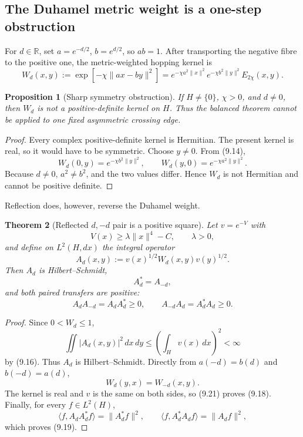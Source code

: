 \documentclass[11pt]{article}
\newtheorem{theorem}{Theorem}[section]
\newtheorem{proposition}[theorem]{Proposition}
\theoremstyle{remark}
\begin{document}
\subsection{The Duhamel metric weight is a one-step obstruction}

For \(d\in\mathbb R\), set \(a=e^{-d/2}\), \(b=e^{d/2}\), so \(ab=1\).
After transporting the negative fibre to the positive one, the
metric-weighted hopping kernel is
\[
 W_d(x,y)
 :=\exp\!\left[-\chi\|ax-by\|^2\right]
 =e^{-\chi a^2\|x\|^2}e^{-\chi b^2\|y\|^2}E_{2\chi}(x,y).
                                                               \tag{9.14}
\]

\begin{proposition}[Sharp symmetry obstruction]
\label{prop:v19v6-asymmetry}
If \(H\neq\{0\}\), \(\chi>0\), and \(d\neq0\), then \(W_d\) is not a
positive-definite kernel on \(H\).  Thus the balanced theorem cannot be
applied to one fixed asymmetric crossing edge.
\end{proposition}

\begin{proof}
Every complex positive-definite kernel is Hermitian.  The present kernel is
real, so it would have to be symmetric.  Choose \(y\neq0\).  From (9.14),
\[
 W_d(0,y)=e^{-\chi b^2\|y\|^2},
 \qquad
 W_d(y,0)=e^{-\chi a^2\|y\|^2}.                                \tag{9.15}
\]
Because \(d\neq0\), \(a^2\neq b^2\), and the two values differ.  Hence
\(W_d\) is not Hermitian and cannot be positive definite.
\end{proof}

Reflection does, however, reverse the Duhamel weight.

\begin{theorem}[Reflected \(d,-d\) pair is a positive square]
\label{thm:v19v6-paired}
Let \(v=e^{-V}\) with
\[
 V(x)\geq\lambda\|x\|^4-C,\qquad \lambda>0,                    \tag{9.16}
\]
and define on \(L^2(H,dx)\) the integral operator
\[
 A_d(x,y):=v(x)^{1/2}W_d(x,y)v(y)^{1/2}.                       \tag{9.17}
\]
Then \(A_d\) is Hilbert--Schmidt,
\[
 A_d^*=A_{-d},                                                  \tag{9.18}
\]
and both paired transfers are positive:
\[
 A_dA_{-d}=A_dA_d^*\geq0,
 \qquad
 A_{-d}A_d=A_d^*A_d\geq0.                                     \tag{9.19}
\]
\end{theorem}

\begin{proof}
Since \(0<W_d\leq1\),
\[
 \iint |A_d(x,y)|^2\,dx\,dy
 \leq\left(\int_Hv(x)\,dx\right)^2<\infty                      \tag{9.20}
\]
by (9.16).  Thus \(A_d\) is Hilbert--Schmidt.  Directly from \(a(-d)=b(d)\)
and \(b(-d)=a(d)\),
\[
 W_d(y,x)=W_{-d}(x,y).                                         \tag{9.21}
\]
The kernel is real and \(v\) is the same on both sides, so (9.21) proves
(9.18).  Finally, for every \(f\in L^2(H)\),
\[
 \langle f,A_dA_d^*f\rangle=\|A_d^*f\|^2,\qquad
 \langle f,A_d^*A_df\rangle=\|A_df\|^2,                        \tag{9.22}
\]
which proves (9.19).
\end{proof}
\end{document}
